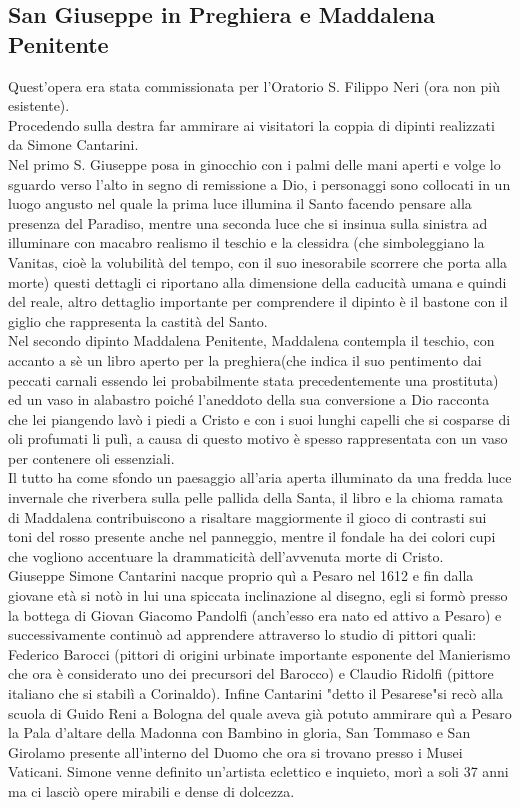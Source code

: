 \documentclass[hidelinks,12pt,a4paper]{article}
\begin{document}
\begin{flushleft}
			\subsection{San Giuseppe in Preghiera e Maddalena Penitente}
			Quest'opera era stata commissionata per l'Oratorio S. Filippo Neri (ora non più esistente).\\
			Procedendo sulla destra far ammirare ai visitatori la coppia di dipinti realizzati da Simone Cantarini.\\
			Nel primo S. Giuseppe posa in ginocchio con i palmi delle mani aperti e volge lo sguardo verso l'alto in segno di remissione a Dio, i personaggi sono collocati in un luogo angusto nel quale la prima luce illumina il Santo facendo pensare alla presenza del Paradiso, mentre una seconda luce che si insinua sulla sinistra ad illuminare con macabro realismo il teschio e la clessidra (che simboleggiano la Vanitas, cioè la volubilità del tempo, con il suo inesorabile scorrere che porta alla morte) questi dettagli ci riportano alla dimensione della caducità umana e quindi del reale, altro dettaglio importante per comprendere il dipinto è il bastone con il giglio che rappresenta la castità del Santo.\\
			Nel secondo dipinto Maddalena Penitente, Maddalena contempla il teschio, con accanto a sè un libro aperto per la preghiera(che indica il suo pentimento dai peccati carnali essendo lei probabilmente stata precedentemente una prostituta) ed un vaso in alabastro poiché l'aneddoto della sua conversione a Dio racconta che lei piangendo lavò i piedi a Cristo e con i suoi lunghi capelli che si cosparse di oli profumati li pulì, a causa di questo motivo è spesso rappresentata con un vaso per contenere oli essenziali.\\
			Il tutto ha come sfondo un paesaggio all'aria aperta illuminato da una fredda luce invernale che riverbera sulla pelle pallida della Santa, il libro e la chioma ramata di Maddalena contribuiscono a risaltare maggiormente il gioco di contrasti sui toni del rosso presente anche nel panneggio, mentre il fondale ha dei colori cupi che vogliono accentuare la drammaticità dell'avvenuta morte di Cristo.\\
			Giuseppe Simone Cantarini nacque proprio quì a Pesaro nel 1612 e fin dalla giovane età si notò in lui una spiccata inclinazione al disegno, egli si formò presso la bottega di Giovan Giacomo Pandolfi (anch'esso era nato ed attivo a Pesaro) e successivamente continuò ad apprendere attraverso lo studio di pittori quali: Federico Barocci (pittori di origini urbinate importante esponente del Manierismo che ora è considerato uno dei precursori del Barocco) e Claudio Ridolfi (pittore italiano che si stabilì a Corinaldo). Infine Cantarini "detto il Pesarese"si recò alla scuola di Guido Reni a Bologna del quale aveva già potuto ammirare quì a Pesaro la Pala d'altare della Madonna con Bambino in gloria, San Tommaso e San Girolamo presente all'interno del Duomo che ora si trovano presso i Musei Vaticani. Simone venne definito un'artista eclettico e inquieto, morì a soli 37 anni ma ci lasciò opere mirabili e dense di dolcezza.\\

\end{flushleft}
\end{document}
